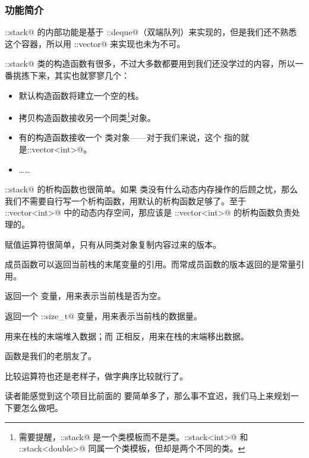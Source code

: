 \subsubsection*{功能简介}
\lstinline@std::stack@ 的内部功能是基于 \lstinline@std::deque@（双端队列）来实现的，但是我们还不熟悉这个容器，所以用 \lstinline@std::vector@ 来实现也未为不可。\par
\lstinline@std::stack@ 类的构造函数有很多，不过大多数都要用到我们还没学过的内容，所以一番挑拣下来，其实也就寥寥几个：
\begin{itemize}
    \item 默认构造函数将建立一个空的栈。
    \item 拷贝构造函数接收另一个同类\footnote{需要提醒，\lstinline@std::stack@ 是一个类模板而不是类。\lstinline@std::stack<int>@ 和 \lstinline@std::stack<double>@ 同属一个类模板，但却是两个不同的类。}对象。
    \item 有的构造函数接收一个 \lstinline@Container@ 类对象——对于我们来说，这个 \lstinline@Container@ 指的就是\newline\lstinline@std::vector<int>@。
    \item ……
\end{itemize}
\lstinline@std::stack@ 的析构函数也很简单。如果 \lstinline@stack@ 类没有什么动态内存操作的后顾之忧，那么我们不需要自行写一个析构函数，用默认的析构函数足够了。至于 \lstinline@std::vector<int>@ 中的动态内存空间，那应该是 \lstinline@std::vector<int>@ 的析构函数负责处理的。\par
赋值运算符很简单，只有从同类对象复制内容过来的版本。\par
\lstinline@top@ 成员函数可以返回当前栈的末尾变量的引用。而常成员函数的版本返回的是常量引用。\par
\lstinline@empty@ 返回一个 \lstinline@bool@ 变量，用来表示当前栈是否为空。\par
\lstinline@size@ 返回一个 \lstinline@std::size_t@ 变量，用来表示当前栈的数据量。\par
\lstinline@push@ 用来在栈的末端堆入数据；而 \lstinline@pop@ 正相反，用来在栈的末端移出数据。\par
\lstinline@swap@ 函数是我们的老朋友了。\par
比较运算符也还是老样子，做字典序比较就行了。\par
读者能感觉到这个项目比前面的 \lstinline@string@ 要简单多了，那么事不宜迟，我们马上来规划一下要怎么做吧。\par
